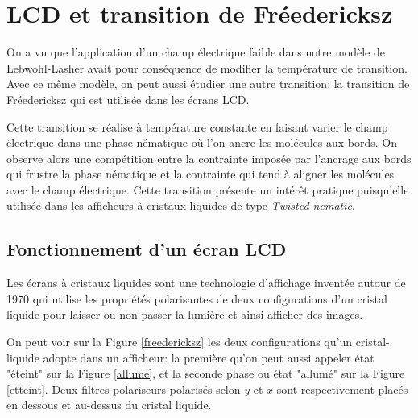 \documentclass[11pt]{article}
\numberwithin{equation}{section}
\begin{document}
\section{LCD et transition de Fréedericksz}
\label{lcd_partie}




On a vu que l'application d'un champ électrique faible dans notre modèle de Lebwohl-Lasher avait pour conséquence de modifier la température de transition. Avec ce même modèle, on peut aussi étudier une autre transition: la transition de Fréedericksz qui est utilisée dans les écrans LCD. 
\medskip

Cette transition se réalise à température constante en faisant varier le champ électrique dans une phase nématique où l'on ancre les molécules aux bords. On observe alors une compétition entre la contrainte imposée par l'ancrage aux bords qui frustre la phase nématique et la contrainte qui tend à aligner les molécules avec le champ électrique. Cette transition présente un intérêt pratique puisqu'elle utilisée dans les afficheurs à cristaux liquides de type \textit{Twisted nematic}.

\subsection{Fonctionnement d'un écran LCD}

Les écrans à cristaux liquides sont une technologie d'affichage inventée autour de 1970 qui utilise les propriétés polarisantes de deux configurations d'un cristal liquide pour laisser ou non passer la lumière et ainsi afficher des images. 
\medskip

On peut voir sur la Figure \ref{freedericksz} les deux configurations qu'un cristal-liquide adopte dans un afficheur: la première qu'on peut aussi appeler état "éteint" sur la Figure \ref{allume}, et la seconde phase ou état "allumé" sur la Figure \ref{etteint}. Deux filtres polariseurs polarisés selon $y$ et $x$ sont respectivement placés en dessous et au-dessus du cristal liquide.
\end{document}
